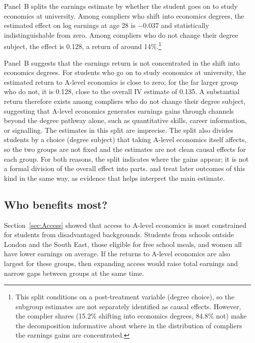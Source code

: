 Panel~B splits the earnings estimate by whether the student goes on to study economics at university. Among compliers who shift into economics degrees, the estimated effect on log earnings at age 28 is $-0.037$ and statistically indistinguishable from zero. Among compliers who do not change their degree subject, the effect is 0.128, a return of around 14\%.\footnote{This split conditions on a post-treatment variable (degree choice), so the subgroup estimates are not separately identified as causal effects. However, the complier shares (15.2\% shifting into economics degrees, 84.8\% not) make the decomposition informative about where in the distribution of compliers the earnings gains are concentrated.}

Panel~B suggests that the earnings return is not concentrated in the shift into economics degrees. For students who go on to study economics at university, the estimated return to A-level economics is close to zero; for the far larger group who do not, it is 0.128, close to the overall IV estimate of 0.135. A substantial return therefore exists among compliers who do not change their degree subject, suggesting that A-level economics generates earnings gains through channels beyond the degree pathway alone, such as quantitative skills, career information, or signalling. The estimates in this split are imprecise. The split also divides students by a choice (degree subject) that taking A-level economics itself affects, so the two groups are not fixed and the estimates are not clean causal effects for each group. For both reasons, the split indicates where the gains appear; it is not a formal division of the overall effect into parts. \citet{goodman2019math} and \citet{joensen2009returns} treat later outcomes of this kind in the same way, as evidence that helps interpret the main estimate.

\subsection{Who benefits most?}
\label{sec:heterogeneity}

Section~\ref{sec:Access} showed that access to A-level economics is most constrained for students from disadvantaged backgrounds. Students from schools outside London and the South East, those eligible for free school meals, and women all have lower earnings on average. If the returns to A-level economics are also largest for these groups, then expanding access would raise total earnings and narrow gaps between groups at the same time.

